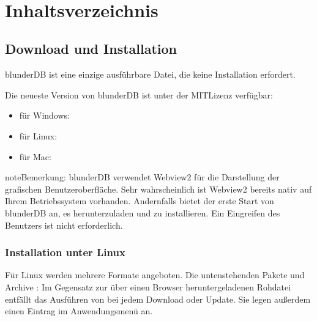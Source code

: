 \documentclass[letterpaper,10pt,german]{sphinxmanual}
\begin{document}
\begin{savenotes}
\begin{longtable}{}
\begin{varwidth}[t]{}
\sphinxbeforeendvarwidth
\end{varwidth}%
\\
\sphinxbottomrule
\end{longtable}
\sphinxtableafterendhook
\sphinxatlongtableend
\end{savenotes}


\chapter{Inhaltsverzeichnis}
\label{\detokenize{index:sommaire}}
\sphinxstepscope


\section{Download und Installation}
\label{\detokenize{telecharge_install:telechargement-et-installation}}\label{\detokenize{telecharge_install:telecharge-install}}\label{\detokenize{telecharge_install::doc}}
\sphinxAtStartPar
blunderDB ist eine einzige ausführbare Datei, die keine Installation erfordert.

\sphinxAtStartPar
Die neueste Version von blunderDB ist unter der MIT\sphinxhyphen{}Lizenz verfügbar:
\begin{itemize}
\item {} 
\sphinxAtStartPar
für Windows: 

\item {} 
\sphinxAtStartPar
für Linux: 

\item {} 
\sphinxAtStartPar
für Mac: 

\end{itemize}

\begin{sphinxadmonition}{note}{Bemerkung:}
\sphinxAtStartPar
blunderDB verwendet Webview2 für die Darstellung der grafischen Benutzeroberfläche. Sehr wahrscheinlich ist Webview2 bereits nativ auf Ihrem Betriebssystem vorhanden. Andernfalls bietet der erste Start von blunderDB an, es herunterzuladen und zu installieren. Ein Eingreifen des Benutzers ist nicht erforderlich.
\end{sphinxadmonition}


\subsection{Installation unter Linux}
\label{\detokenize{telecharge_install:installation-sous-linux}}
\sphinxAtStartPar
Für Linux werden mehrere Formate angeboten. Die untenstehenden Pakete und Archive : Im Gegensatz zur über einen Browser heruntergeladenen Rohdatei entfällt das Ausführen von  bei jedem Download oder Update. Sie legen außerdem einen Eintrag im Anwendungsmenü an.
\end{document}
